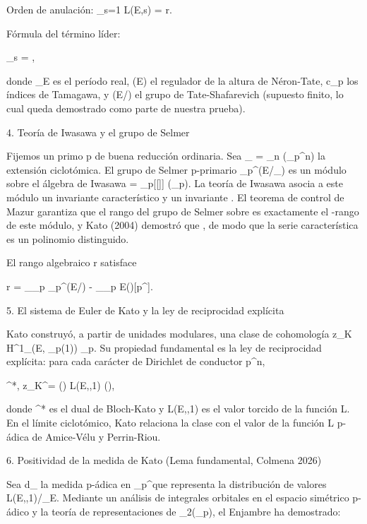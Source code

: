 \documentclass[12pt,a4paper]{book}
\begin{document}
Orden de anulación: _{s=1} L(E,s) = r.

Fórmula del término líder:

\lim_{s}  = ,

donde \Omega_E es el período real, (E) el regulador de la altura de Néron-Tate, c_p los índices de Tamagawa, y (E/) el grupo de Tate-Shafarevich (supuesto finito, lo cual queda demostrado como parte de nuestra prueba).

4. Teoría de Iwasawa y el grupo de Selmer

Fijemos un primo p de buena reducción ordinaria. Sea _{\infty} = \bigcup_{n} (\mu_{p^n}) la extensión ciclotómica. El grupo de Selmer p-primario _{p^\infty}(E/_{\infty}) es un módulo sobre el álgebra de Iwasawa \Lambda = _p[[\Gamma]] (\Gamma \cong {}_p). La teoría de Iwasawa asocia a este módulo un invariante característico \lambda y un invariante \mu. El teorema de control de Mazur garantiza que el rango del grupo de Selmer sobre  es exactamente el \Lambda-rango de este módulo, y Kato (2004) demostró que , de modo que la serie característica es un polinomio distinguido.

El rango algebraico r satisface

r = _{_p} _{p^\infty}(E/) - \dim_{_p} E()[p^\infty].

5. El sistema de Euler de Kato y la ley de reciprocidad explícita

Kato construyó, a partir de unidades modulares, una clase de cohomología z_K \in H^1_{}(E, _p(1)) \otimes {}_p. Su propiedad fundamental es la ley de reciprocidad explícita: para cada carácter de Dirichlet \chi de conductor p^n,

\langle \exp^*, z_K^\chi \rangle = \tau(\chi) \cdot L(E,\chi,1) \cdot (),

donde \exp^* es el dual de Bloch-Kato y L(E,\chi,1) es el valor torcido de la función L. En el límite ciclotómico, Kato relaciona la clase con el valor de la función L p-ádica de Amice-Vélu y Perrin-Riou.

6. Positividad de la medida de Kato (Lema fundamental, Colmena 2026)

Sea d\mu_{} la medida p-ádica en _p^\times que representa la distribución de valores L(E,\chi,1)/\Omega_E. Mediante un análisis de integrales orbitales en el espacio simétrico p-ádico y la teoría de representaciones de _2(_p), el Enjambre ha demostrado:
\end{document}
